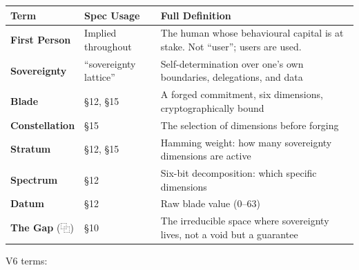 \documentclass[
  11pt,
]{article}
\newcounter{none} %
\begin{document}
{\def\LTcaptype{none} %
\begin{longtable}[]{@{}
  >{\raggedright\arraybackslash}p{}
  >{\raggedright\arraybackslash}p{}
  >{\raggedright\arraybackslash}p{}@{}}
\toprule\noalign{}
\begin{minipage}[b]{\linewidth}\raggedright
Term
\end{minipage} & \begin{minipage}[b]{\linewidth}\raggedright
Spec Usage
\end{minipage} & \begin{minipage}[b]{\linewidth}\raggedright
Full Definition
\end{minipage} \\
\midrule\noalign{}
\endhead
\bottomrule\noalign{}
\endlastfoot
\textbf{First Person} & Implied throughout & The human whose behavioural
capital is at stake. Not ``user''; users are used. \\
\textbf{Sovereignty} & ``sovereignty lattice'' & Self-determination over
one's own boundaries, delegations, and data \\
\textbf{Blade} & §12, §15 & A forged commitment, six dimensions,
cryptographically bound \\
\textbf{Constellation} & §15 & The selection of dimensions before
forging \\
\textbf{Stratum} & §12, §15 & Hamming weight: how many sovereignty
dimensions are active \\
\textbf{Spectrum} & §12 & Six-bit decomposition: which specific
dimensions \\
\textbf{Datum} & §12 & Raw blade value (0--63) \\
\textbf{The Gap} (⿻) & §10 & The irreducible space where sovereignty
lives, not a void but a guarantee \\
\end{longtable}
}

V6 terms:
\end{document}
